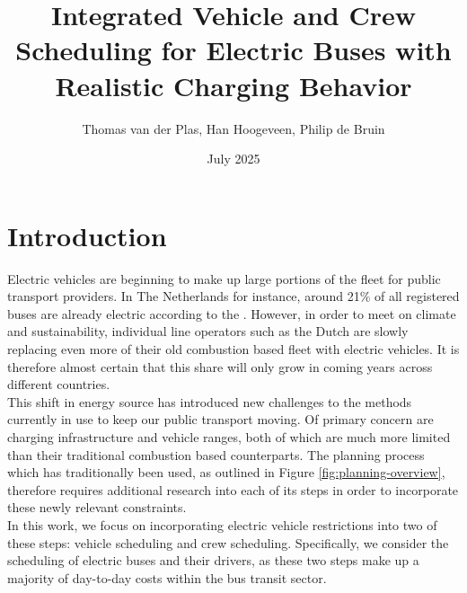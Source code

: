 \documentclass[]{article}
\title{Integrated Vehicle and Crew Scheduling for Electric Buses with Realistic Charging Behavior}
\date{July 2025}
\author{Thomas van der Plas, Han Hoogeveen, Philip de Bruin}
\begin{document}
\maketitle

\section{Introduction}
Electric vehicles are beginning to make up large portions of the fleet for
public transport providers. In The Netherlands for instance, around 21\% of all
registered buses are already electric according to the \citet{RDW}. However,
in order to meet \citet{europaRegulation20181999} on climate and sustainability, individual
line operators such as the Dutch \citet{qbuzzQbuzz} are slowly replacing even more of their old
combustion based fleet with electric vehicles. It is therefore almost certain that this share will only grow in
coming years across different countries. \\
This shift in energy source has introduced new challenges to the methods currently in use to keep our public transport moving. Of primary concern are charging infrastructure and vehicle ranges, both of which are much more limited than their traditional combustion based counterparts. The planning process which has traditionally been used, as outlined in Figure \ref{fig:planning-overview}, therefore requires additional research into each of its steps in order to incorporate these newly relevant constraints.\\
\noindent In this work, we focus on incorporating electric vehicle restrictions into two of these steps: vehicle scheduling and crew scheduling. Specifically, we consider the scheduling of electric buses and their drivers, as these two steps make up a majority of day-to-day costs within the bus transit sector. \\
\end{document}

